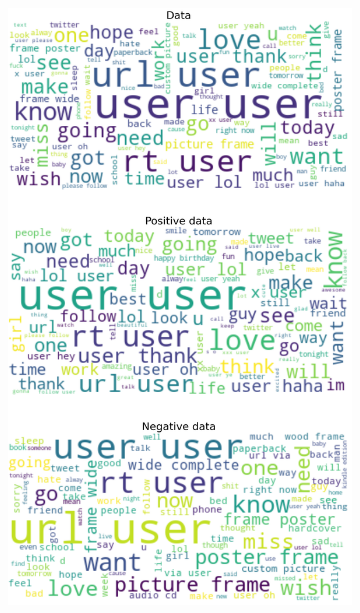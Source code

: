 \documentclass{article}
\begin{document}
\begin{itemize}
  \begin{figure}[H]
    \centering
    \captionsetup{justification=centering}
    \begin{subfigure}[b]{0.24\textwidth}
      \centering
      \includegraphics[width=\textwidth]{chapter-06/section-01-01/06/visualization/1/wordcloud.png}
    \end{subfigure}
    \begin{subfigure}[b]{0.24\textwidth}
      \centering

\end{subfigure}
\end{figure}
\end{itemize}
\end{document}

